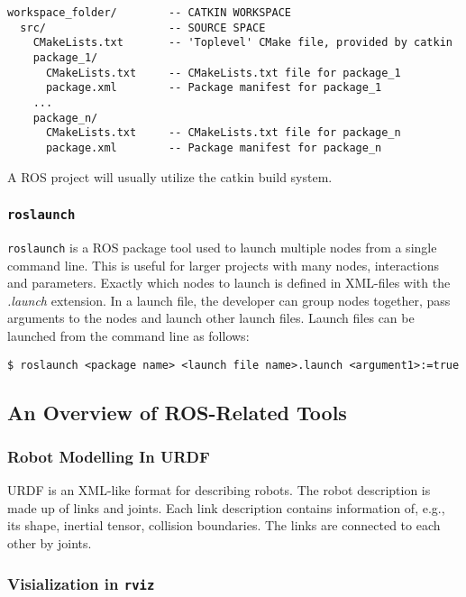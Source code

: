 \begin{verbatim}
workspace_folder/        -- CATKIN WORKSPACE
  src/                   -- SOURCE SPACE
    CMakeLists.txt       -- 'Toplevel' CMake file, provided by catkin
    package_1/
      CMakeLists.txt     -- CMakeLists.txt file for package_1
      package.xml        -- Package manifest for package_1
    ...
    package_n/
      CMakeLists.txt     -- CMakeLists.txt file for package_n
      package.xml        -- Package manifest for package_n
\end{verbatim}

A \ac{ROS} project will usually utilize the catkin build system.

\subsubsection{\texttt{roslaunch}}

\texttt{roslaunch}\cite{ROS_launch} is a \ac{ROS} package tool used to launch multiple nodes from a single command line. This is useful for larger projects with many nodes, interactions and parameters. Exactly which nodes to launch is defined in XML-files with the \textit{.launch} extension. In a launch file, the developer can group nodes together, pass arguments to the nodes and launch other launch files. Launch files can be launched from the command line as follows:

\begin{verbatim}
$ roslaunch <package name> <launch file name>.launch <argument1>:=true
\end{verbatim}

\subsection{An Overview of ROS-Related Tools}

\subsubsection{Robot Modelling In URDF}

\ac{URDF} is an XML-like format for describing robots. The robot description is made up of links and joints. Each link description contains information of, e.g., its shape, inertial tensor, collision boundaries. The links are connected to each other by joints.

\subsubsection{Visialization in \texttt{rviz}}

